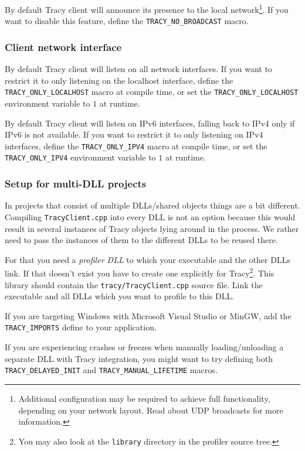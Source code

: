 \documentclass[hidelinks,titlepage,a4paper]{article}
\begin{document}
By default Tracy client will announce its presence to the local network\footnote{Additional configuration may be required to achieve full functionality, depending on your network layout. Read about UDP broadcasts for more information.}. If you want to disable this feature, define the \texttt{TRACY\_NO\_BROADCAST} macro.

\subsubsection{Client network interface}

By default Tracy client will listen on all network interfaces. If you want to restrict it to only listening on the localhost interface, define the \texttt{TRACY\_ONLY\_LOCALHOST} macro at compile time, or set the \texttt{TRACY\_ONLY\_LOCALHOST} environment variable to $1$ at runtime.

By default Tracy client will listen on IPv6 interfaces, falling back to IPv4 only if IPv6 is not available. If you want to restrict it to only listening on IPv4 interfaces, define the \texttt{TRACY\_ONLY\_IPV4} macro at compile time, or set the \texttt{TRACY\_ONLY\_IPV4} environment variable to $1$ at runtime.

\subsubsection{Setup for multi-DLL projects}

In projects that consist of multiple DLLs/shared objects things are a bit different. Compiling \texttt{TracyClient.cpp} into every DLL is not an option because this would result in several instances of Tracy objects lying around in the process. We rather need to pass the instances of them to the different DLLs to be reused there.

For that you need a \emph{profiler DLL} to which your executable and the other DLLs link. If that doesn't exist you have to create one explicitly for Tracy\footnote{You may also look at the \texttt{library} directory in the profiler source tree.}. This library should contain the \texttt{tracy/TracyClient.cpp} source file. Link the executable and all DLLs which you want to profile to this DLL.

If you are targeting Windows with Microsoft Visual Studio or MinGW, add the \texttt{TRACY\_IMPORTS} define to your application.

If you are experiencing crashes or freezes when manually loading/unloading a separate DLL with Tracy integration, you might want to try defining both \texttt{TRACY\_DELAYED\_INIT} and \texttt{TRACY\_MANUAL\_LIFETIME} macros.
\end{document}
